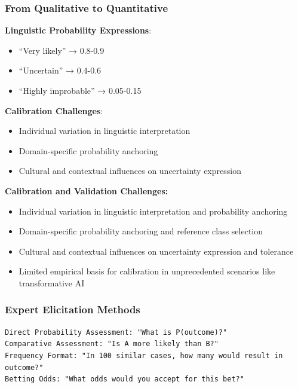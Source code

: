 \documentclass[
  11pt,
  letterpaper,
]{book}
\providecommand{\tightlist}{%
  \setlength{\itemsep}{0pt}\setlength{\parskip}{0pt}}
\begin{document}
\subsubsection{From Qualitative to
Quantitative}\label{sec-qualitative-to-quantitative}

\textbf{Linguistic Probability Expressions}:

\begin{itemize}
\tightlist
\item
  ``Very likely'' → 0.8-0.9
\item
  ``Uncertain'' → 0.4-0.6
\item
  ``Highly improbable'' → 0.05-0.15
\end{itemize}

\textbf{Calibration Challenges}:

\begin{itemize}
\tightlist
\item
  Individual variation in linguistic interpretation
\item
  Domain-specific probability anchoring
\item
  Cultural and contextual influences on uncertainty expression
\end{itemize}

\textbf{Calibration and Validation Challenges:}

\begin{itemize}
\tightlist
\item
  Individual variation in linguistic interpretation and probability
  anchoring
\item
  Domain-specific probability anchoring and reference class selection
\item
  Cultural and contextual influences on uncertainty expression and
  tolerance
\item
  Limited empirical basis for calibration in unprecedented scenarios
  like transformative AI
\end{itemize}

\subsubsection{Expert Elicitation Methods}\label{sec-expert-elicitation}

\begin{verbatim}
Direct Probability Assessment: "What is P(outcome)?"
Comparative Assessment: "Is A more likely than B?"  
Frequency Format: "In 100 similar cases, how many would result in outcome?"
Betting Odds: "What odds would you accept for this bet?"
\end{verbatim}
\end{document}
